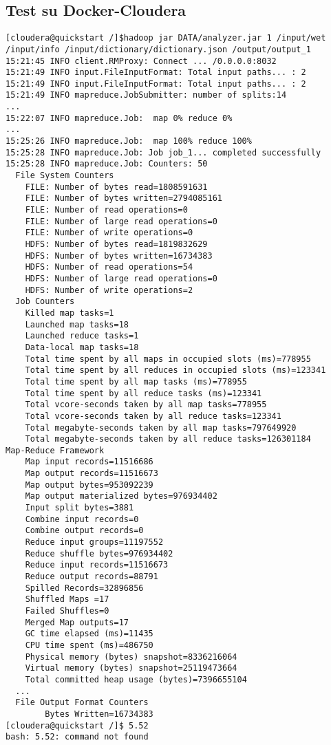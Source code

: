 \documentclass{article}
\begin{document}
\subsection{Test su Docker-Cloudera}
\begin{verbatim}
[cloudera@quickstart /]$hadoop jar DATA/analyzer.jar 1 /input/wet
/input/info /input/dictionary/dictionary.json /output/output_1
15:21:45 INFO client.RMProxy: Connect ... /0.0.0.0:8032
15:21:49 INFO input.FileInputFormat: Total input paths... : 2
15:21:49 INFO input.FileInputFormat: Total input paths... : 2
15:21:49 INFO mapreduce.JobSubmitter: number of splits:14
...
15:22:07 INFO mapreduce.Job:  map 0% reduce 0%
...
15:25:26 INFO mapreduce.Job:  map 100% reduce 100%
15:25:28 INFO mapreduce.Job: Job job_1... completed successfully
15:25:28 INFO mapreduce.Job: Counters: 50
  File System Counters
    FILE: Number of bytes read=1808591631
    FILE: Number of bytes written=2794085161
    FILE: Number of read operations=0
    FILE: Number of large read operations=0
    FILE: Number of write operations=0
    HDFS: Number of bytes read=1819832629
    HDFS: Number of bytes written=16734383
    HDFS: Number of read operations=54
    HDFS: Number of large read operations=0
    HDFS: Number of write operations=2
  Job Counters 
    Killed map tasks=1
    Launched map tasks=18
    Launched reduce tasks=1
    Data-local map tasks=18
    Total time spent by all maps in occupied slots (ms)=778955
    Total time spent by all reduces in occupied slots (ms)=123341
    Total time spent by all map tasks (ms)=778955
    Total time spent by all reduce tasks (ms)=123341
    Total vcore-seconds taken by all map tasks=778955
    Total vcore-seconds taken by all reduce tasks=123341
    Total megabyte-seconds taken by all map tasks=797649920
    Total megabyte-seconds taken by all reduce tasks=126301184
Map-Reduce Framework
    Map input records=11516686
    Map output records=11516673
    Map output bytes=953092239
    Map output materialized bytes=976934402
    Input split bytes=3881
    Combine input records=0
    Combine output records=0
    Reduce input groups=11197552
    Reduce shuffle bytes=976934402
    Reduce input records=11516673
    Reduce output records=88791
    Spilled Records=32896856
    Shuffled Maps =17
    Failed Shuffles=0
    Merged Map outputs=17
    GC time elapsed (ms)=11435
    CPU time spent (ms)=486750
    Physical memory (bytes) snapshot=8336216064
    Virtual memory (bytes) snapshot=25119473664
    Total committed heap usage (bytes)=7396655104
  ...
  File Output Format Counters 
        Bytes Written=16734383
[cloudera@quickstart /]$ 5.52
bash: 5.52: command not found
\end{verbatim}
\end{document}
